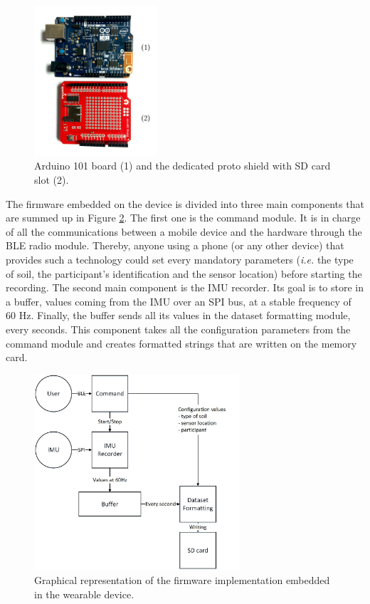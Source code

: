 \documentclass[conference]{IEEEtran}
\begin{document}
\begin{figure}[!t]
  \centering
  \includegraphics[width=1.8in]{arduino_101}
  \caption{Arduino 101 board (1) and the dedicated proto shield with SD card slot (2).}
  \label{fig:arduino}
\end{figure}

The firmware \cite{Plantevin2016} embedded on the device is divided into three main components that are summed up in Figure \ref{fig:hardware}. The first one is the command module. It is in charge of all the communications between a mobile device and the hardware through the BLE radio module. Thereby, anyone using a phone (or any other device) that provides such a technology could set every mandatory parameters (\textit{i.e.} the type of soil, the participant's identification and the sensor location) before starting the recording. The second main component is the IMU  recorder. Its goal is to store in a buffer, values coming from the IMU over an SPI bus, at a stable frequency of 60 Hz. Finally, the buffer sends all its values in the dataset formatting module, every seconds. This component takes all the configuration parameters from the command module and creates formatted strings that are written on the memory card. 

\begin{figure}[!ht]
  \centering
  \includegraphics[width=3in]{hardware}
  \caption{Graphical representation of the firmware implementation embedded in the wearable device.}
  \label{fig:hardware}
\end{figure}
\end{document}
